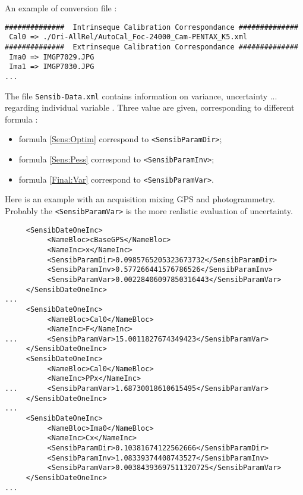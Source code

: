 An example of conversion file :

\begin{verbatim}
##############  Intrinseque Calibration Correspondance ##############
 Cal0 => ./Ori-AllRel/AutoCal_Foc-24000_Cam-PENTAX_K5.xml
##############  Extrinseque Calibration Correspondance ##############
 Ima0 => IMGP7029.JPG
 Ima1 => IMGP7030.JPG
...
\end{verbatim}

The file {\tt Sensib-Data.xml} contains information on  variance, uncertainty  ...
regarding individual variable . Three value are given, corresponding
to different formula  :

\begin{itemize}
    \item formula \ref{Sens:Optim}  correspond to {\tt <SensibParamDir>};
    \item formula \ref{Sens:Pess}   correspond to {\tt <SensibParamInv>};
    \item formula \ref{Final:Var}   correspond to {\tt <SensibParamVar>}.
\end{itemize}

Here is an example with an acquisition mixing GPS and photogrammetry. Probably the
 {\tt <SensibParamVar>} is the more realistic evaluation of uncertainty.

\begin{verbatim}
     <SensibDateOneInc>
          <NameBloc>cBaseGPS</NameBloc>
          <NameInc>x</NameInc>
          <SensibParamDir>0.0985765205323673732</SensibParamDir>
          <SensibParamInv>0.577266441576786526</SensibParamInv>
          <SensibParamVar>0.00228406097850316443</SensibParamVar>
     </SensibDateOneInc>
...
     <SensibDateOneInc>
          <NameBloc>Cal0</NameBloc>
          <NameInc>F</NameInc>
...       <SensibParamVar>15.0011827674349423</SensibParamVar>
     </SensibDateOneInc>
     <SensibDateOneInc>
          <NameBloc>Cal0</NameBloc>
          <NameInc>PPx</NameInc>
...       <SensibParamVar>1.68730018610615495</SensibParamVar>
     </SensibDateOneInc>
...
     <SensibDateOneInc>
          <NameBloc>Ima0</NameBloc>
          <NameInc>Cx</NameInc>
          <SensibParamDir>0.10381674122562666</SensibParamDir>
          <SensibParamInv>1.08339374408743527</SensibParamInv>
          <SensibParamVar>0.00384393697511320725</SensibParamVar>
     </SensibDateOneInc>
...
\end{verbatim}






